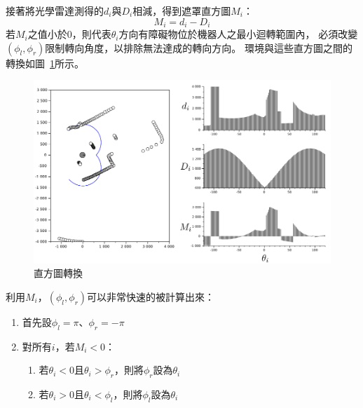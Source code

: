 接著將光學雷達測得的$d_i$與$D_i$相減，得到遮罩直方圖$M_i$：
\begin{equation}
	M_i = d_i - D_i
\end{equation}
若$M_i$之值小於$0$，則代表$\theta_i$方向有障礙物位於機器人之最小迴轉範圍內，
必須改變$(\phi_l,\phi_r)$限制轉向角度，以排除無法達成的轉向方向。
環境與這些直方圖之間的轉換如圖~\ref{f:histogram_transform}所示。
\begin{figure}[h!]
	\centering
	\includegraphics[width=\textwidth]{figures/algorithm/histogram_transform}
	\caption{直方圖轉換}
	\label{f:histogram_transform}
\end{figure}

利用$M_i$，$(\phi_l,\phi_r)$可以非常快速的被計算出來：
\begin{enumerate}
	\item{首先設$\phi_l = \pi$、$\phi_r = -\pi$}
	\item{對所有$i$，若$M_i < 0$：}
		\begin{enumerate}
			\item{若$\theta_i < 0$且$\theta_i > \phi_r$，則將$\phi_r$設為$\theta_i$}
			\item{若$\theta_i > 0$且$\theta_i < \phi_l$，則將$\phi_l$設為$\theta_i$}
		\end{enumerate}
\end{enumerate}

